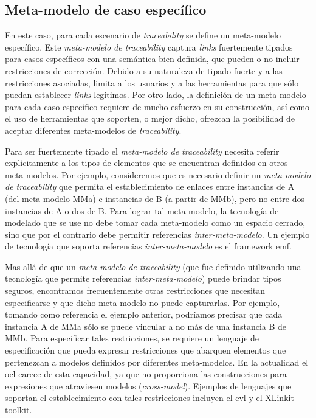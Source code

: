 \documentclass[a4paper,12pt,oneside,spanish]{book}
\begin{document}
\subsection{Meta-modelo de caso específico}

En este caso, para cada escenario de \textit{traceability} se define un meta-modelo específico. Este \textit{meta-modelo de traceability} captura \textit{links} fuertemente tipados para casos específicos con una semántica bien definida, que pueden o no incluir restricciones de corrección. Debido a su naturaleza de tipado fuerte y a las restricciones asociadas, limita a los usuarios y a las herramientas para que sólo puedan establecer \textit{links} legítimos. Por otro lado, la definición de un meta-modelo para cada caso específico requiere de mucho esfuerzo en su construcción, así como el uso de herramientas que soporten, o mejor dicho, ofrezcan la posibilidad de aceptar diferentes meta-modelos de \textit{traceability}.

Para ser fuertemente tipado el \textit{meta-modelo de traceability} necesita referir explícitamente a los tipos de elementos que se encuentran definidos en otros meta-modelos. Por ejemplo, consideremos que es necesario definir un \textit{meta-modelo de traceability} que permita el establecimiento de enlaces entre instancias de \textsf{A} (del meta-modelo \textsf{MMa}) e instancias de \textsf{B} (a partir de \textsf{MMb}), pero no entre dos instancias de \textsf{A} o dos de \textsf{B}. Para lograr tal meta-modelo, la tecnología de modelado que se use no debe tomar cada meta-modelo como un espacio cerrado, sino que por el contrario debe permitir referencias \textit{inter-meta-modelo}. Un ejemplo de tecnología que soporta referencias \textit{inter-meta-modelo} es el framework \gls{emf}.

Mas allá de que un \textit{meta-modelo de traceability} (que fue definido utilizando una tecnología que permite referencias \textit{inter-meta-modelo}) puede brindar tipos seguros, encontramos frecuentemente otras restricciones que necesitan especificarse y que dicho meta-modelo no puede capturarlas. Por ejemplo, tomando como referencia el ejemplo anterior, podríamos precisar que cada instancia \textsf{A} de \textsf{MMa} sólo se puede vincular a no más de una instancia \textsf{B} de \textsf{MMb}. Para especificar tales restricciones, se requiere un lenguaje de especificación que pueda expresar restricciones que abarquen elementos que pertenezcan a modelos definidos por diferentes meta-modelos. En la actualidad el \gls{ocl} carece de esta capacidad, ya que no proporciona las construcciones para expresiones que atraviesen modelos (\textit{cross-model}). Ejemplos de lenguajes que soportan el establecimiento con tales restricciones incluyen el \gls{evl} y el XLinkit toolkit.
\end{document}
